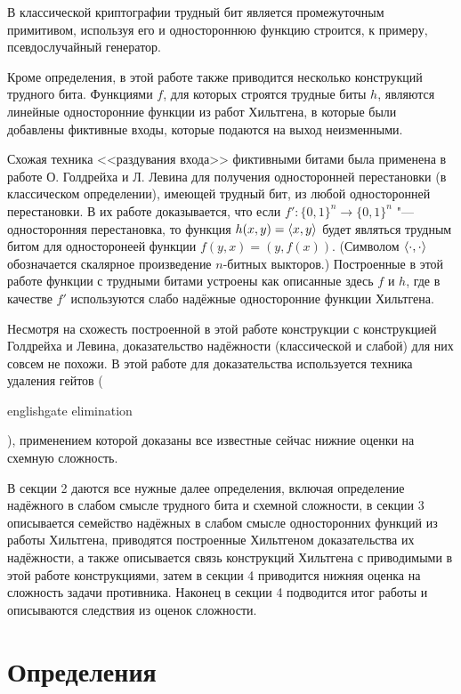 \documentclass[oneside, a4paper]{article}
\theoremstyle{definition}
\theoremstyle{remark}
\DeclarePairedDelimiter\ang{\langle}{\rangle}
\begin{document}
В классической криптографии трудный бит является промежуточным примитивом,
используя его и одностороннюю функцию строится, к примеру, псевдослучайный
генератор.

Кроме определения, в этой работе также приводится несколько конструкций трудного
бита. Функциями $f$, для которых строятся трудные биты $h$, являются линейные
односторонние функции из работ Хильтгена, в которые были добавлены фиктивные
входы, которые подаются на выход неизменными.

Схожая техника <<раздувания входа>> фиктивными битами была применена в работе
О. Голдрейха и Л. Левина \cite{goldreich_levin} для получения односторонней
перестановки (в классическом определении), имеющей трудный бит, из любой
односторонней перестановки. В их работе доказывается, что если $f' : \{0, 1\}^n
\to \{0, 1\}^n$ "--- односторонняя перестановка, то функция $h(x, y) = \ang{x,
y}$ будет являться трудным битом для односторонеей функции $f(y, x) = (y,
f(x))$. (Символом $\ang{\cdot, \cdot}$ обозначается скалярное произведение
$n$-битных выкторов.) Построенные в этой работе функции с трудными битами
устроены как описанные здесь $f$ и $h$, где в качестве $f'$ используются слабо
надёжные односторонние функции Хильтгена.

Несмотря на схожесть построенной в этой работе конструкции с конструкцией
Голдрейха и Левина, доказательство надёжности (классической и слабой) для них
совсем не похожи. В этой работе для доказательства используется техника удаления
гейтов (\begin{foreignlanguage}{english}gate elimination\end{foreignlanguage}),
применением которой доказаны все известные сейчас нижние оценки на схемную
сложность.

В секции 2 даются все нужные далее определения, включая определение
надёжного в слабом смысле трудного бита и схемной сложности, в секции 3
описывается семейство надёжных в слабом смысле односторонних функций из работы
Хильтгена, приводятся построенные Хильтгеном доказательства их надёжности,
а также описывается связь конструкций Хильтгена с приводимыми в этой работе
конструкциями, затем в секции 4 приводится нижняя оценка на сложность задачи
противника. Наконец в секции 4 подводится итог работы и описываются следствия из
оценок сложности.

\section{Определения}
\end{document}
